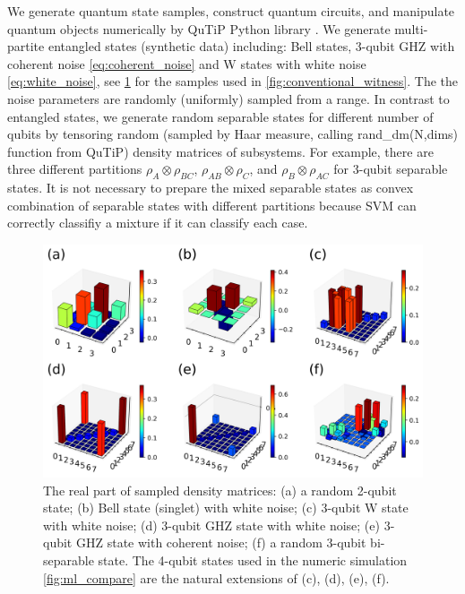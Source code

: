 \documentclass[
aps,
pra,
twocolumn,
floatfix,
]{revtex4-2}
\theoremstyle{plain}
\theoremstyle{definition}
\newcommand{\dm}{\rho}
\begin{document}
We generate quantum state samples, construct quantum circuits, and manipulate quantum objects numerically by QuTiP Python library \cite{johanssonQuTiPPythonFramework2013,liPulselevelNoisyQuantum2022}.
We generate multi-partite entangled states (synthetic data) including: Bell states, 3-qubit GHZ with coherent noise \cref{eq:coherent_noise} and W states with white noise \cref{eq:white_noise}, see \cref{fig:sample_data} for the samples used in \cref{fig:conventional_witness}.
The the noise parameters are randomly (uniformly) sampled from a range.
In contrast to entangled states, we generate random separable states for different number of qubits by tensoring random (sampled by Haar measure, calling \textsf{rand\_dm(N,dims)} function from QuTiP) density matrices of subsystems.
For example,
there are three different partitions $\dm_A\otimes \dm_{BC}$, $\dm_{AB}\otimes \dm_{C}$, and $\dm_B\otimes \dm_{AC}$ for 3-qubit separable states.
It is not necessary to prepare the mixed separable states as convex combination of separable states with different partitions 
because SVM can correctly classifiy a mixture if it can classify each case.
\begin{figure}[!ht]
	\centering
	\includegraphics[width=.9\linewidth]{./Code/dataset_sample_3x2.png}
	\caption{The real part of sampled density matrices: (a) a random 2-qubit state; (b) Bell state (singlet) with white noise; (c) 3-qubit W state with white noise; (d) 3-qubit GHZ state with white noise; (e) 3-qubit GHZ state with coherent noise; (f) a random 3-qubit bi-separable state. The 4-qubit states used in the numeric simulation \cref{fig:ml_compare} are the natural extensions of (c), (d), (e), (f).}
	\label{fig:sample_data}
\end{figure}
\end{document}
